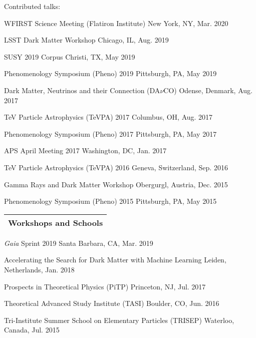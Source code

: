 \documentclass[11pt]{article}
\newenvironment{packed_itemize}{
\begin{itemize}[label=\raisebox{0.25ex}{\tiny$\bullet$}]
  \setlength{\itemsep}{3pt}
  \setlength{\parskip}{0pt}
  \setlength{\parsep}{0pt}}{\end{itemize}
}
\begin{document}
\noindent
Contributed talks:
\begin{packed_itemize}
  \item WFIRST Science Meeting (Flatiron Institute) \hfill New York, NY, Mar. 2020
  \item LSST Dark Matter Workshop \hfill Chicago, IL, Aug. 2019
  \item SUSY 2019 \hfill Corpus Christi, TX, May 2019
  \item Phenomenology Symposium (Pheno) 2019 \hfill Pittsburgh, PA, May 2019
  \item Dark Matter, Neutrinos and their Connection (DA$\nu$CO) \hfill Odense, Denmark, Aug. 2017
  \item TeV Particle Astrophysics (TeVPA) 2017 \hfill Columbus, OH, Aug. 2017 
  \item Phenomenology Symposium (Pheno) 2017 \hfill Pittsburgh, PA, May 2017 
  \item APS April Meeting 2017 \hfill Washington, DC, Jan. 2017 
  \item TeV Particle Astrophysics (TeVPA) 2016 \hfill Geneva, Switzerland, Sep. 2016 
  \item Gamma Rays and Dark Matter Workshop \hfill Obergurgl, Austria, Dec. 2015
  \item Phenomenology Symposium (Pheno) 2015 \hfill Pittsburgh, PA, May 2015
\end{packed_itemize}
\vspace{2.0mm}



\noindent
\begin{tabular*}{\textwidth}{l@{\extracolsep{\fill}}}
\large {\sc \Large{Workshops and Schools}}\\
\hline
\end{tabular*}\vspace{1.mm}

\begin{packed_itemize}
  \item \emph{Gaia} Sprint 2019 \hfill Santa Barbara, CA, Mar. 2019
  \item Accelerating the Search for Dark Matter with Machine Learning \hfill Leiden, Netherlands, Jan. 2018
  \item Prospects in Theoretical Physics (PiTP) \hfill Princeton, NJ, Jul. 2017
  \item Theoretical Advanced Study Institute (TASI) \hfill Boulder, CO, Jun. 2016
  \item Tri-Institute Summer School on Elementary Particles (TRISEP) \hfill Waterloo, Canada, Jul. 2015
\end{packed_itemize}
\vspace{2.0mm}
\end{document}
